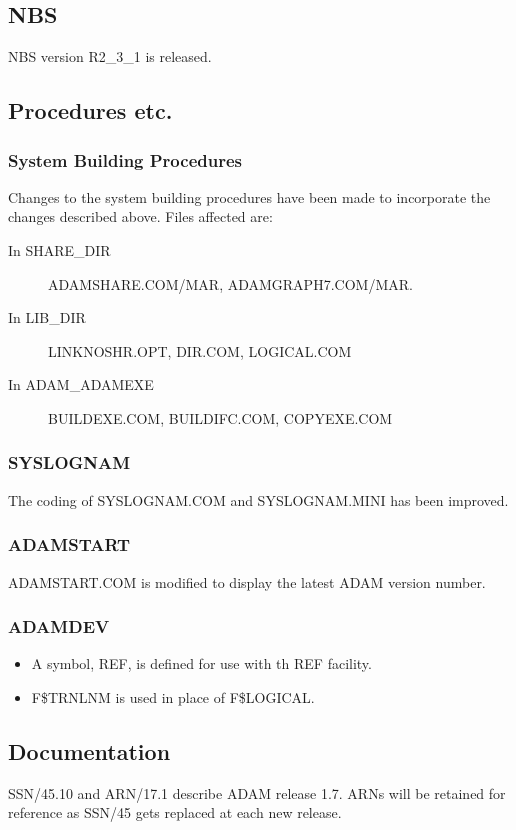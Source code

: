\subsection{NBS}
NBS version R2\_3\_1 is released.

\subsection{Procedures etc.}
\subsubsection{System Building Procedures}
Changes to the system building procedures have been made to incorporate
the changes described above.
Files affected are:
\begin{description}
\item[In SHARE\_DIR] ADAMSHARE.COM/MAR, ADAMGRAPH7.COM/MAR.
\item[In LIB\_DIR] LINKNOSHR.OPT, DIR.COM, LOGICAL.COM
\item[In ADAM\_ADAMEXE] BUILDEXE.COM, BUILDIFC.COM, COPYEXE.COM
\end{description}

\subsubsection{SYSLOGNAM}
The coding of SYSLOGNAM.COM and SYSLOGNAM.MINI has been improved.

\subsubsection{ADAMSTART}
ADAMSTART.COM is modified to display the latest ADAM version number.

\subsubsection{ADAMDEV}
\begin{itemize}
\item A symbol, REF, is defined for use with th REF facility.
\item F\$TRNLNM is used in place of F\$LOGICAL.
\end{itemize}

\subsection{Documentation}
SSN/45.10 and ARN/17.1 describe ADAM release 1.7.
ARNs will be retained for reference as SSN/45 gets replaced at each new release.

